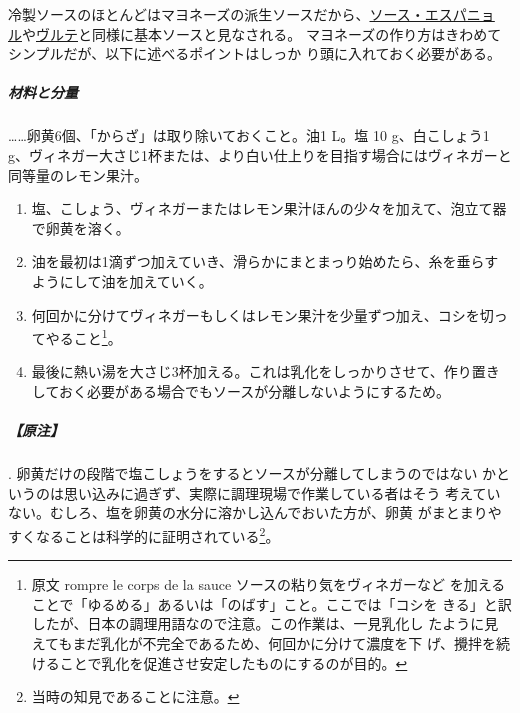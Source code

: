 \begin{recette}

冷製ソースのほとんどはマヨネーズの派生ソースだから、\protect\hyperlink{sauce-espagnole}{ソース・エスパニョ
ル}や\protect\hyperlink{veloute}{ヴルテ}と同様に基本ソースと見なされる。
マヨネーズの作り方はきわめてシンプルだが、以下に述べるポイントはしっか
り頭に入れておく必要がある。

\hypertarget{ux6750ux6599ux3068ux5206ux91cf}{%
\subparagraph{材料と分量}\label{ux6750ux6599ux3068ux5206ux91cf}}

\ldots{}\ldots{}卵黄6個、「からざ」は取り除いておくこと。油1 L。塩 10
g、白こしょう1
g、ヴィネガー大さじ1\undemi{}杯または、より白い仕上りを目指す場合にはヴィネガーと同等量のレモン果汁。

\begin{enumerate}
\def\labelenumi{\arabic{enumi}.}
\item
  塩、こしょう、ヴィネガーまたはレモン果汁ほんの少々を加えて、泡立て器で卵黄を溶く。
\item
  油を最初は1滴ずつ加えていき、滑らかにまとまっり始めたら、糸を垂らすようにして油を加えていく。
\item
  何回かに分けてヴィネガーもしくはレモン果汁を少量ずつ加え、コシを切ってやること\footnote{原文
    rompre le corps de la sauce ソースの粘り気をヴィネガーなど
    を加えることで「ゆるめる」あるいは「のばす」こと。ここでは「コシを
    きる」と訳したが、日本の調理用語なので注意。この作業は、一見乳化し
    たように見えてもまだ乳化が不完全であるため、何回かに分けて濃度を下
    げ、攪拌を続けることで乳化を促進させ安定したものにするのが目的。}。
\item
  最後に熱い湯を大さじ3杯加える。これは乳化をしっかりさせて、作り置きしておく必要がある場合でもソースが分離しないようにするため。
\end{enumerate}

\hypertarget{ux539fux6ce8-2}{%
\subparagraph{【原注】}\label{ux539fux6ce8-2}}

.
卵黄だけの段階で塩こしょうをするとソースが分離してしまうのではない
かというのは思い込みに過ぎず、実際に調理現場で作業している者はそう
考えていない。むしろ、塩を卵黄の水分に溶かし込んでおいた方が、卵黄
がまとまりやすくなることは科学的に証明されている\footnote{当時の知見であることに注意。}。


\end{recette}
